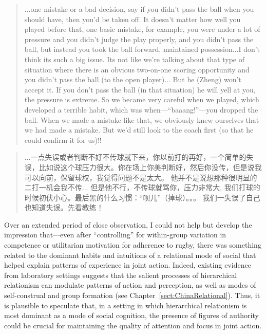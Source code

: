 \begin{CJK}{UTF8}{gbsn}
  \begin{quote}
     ...one mistake or a bad decision, say if you didn't pass the ball when you should have, then you'd be taken off.  It doesn't matter how well you played before that, one basic mistake, for example, you were under a lot of pressure and you didn't judge the play properly, and you didn't pass the ball, but instead you took the ball forward, maintained possession...I don't think its such a big issue.
     Its not like we're talking about that type of situation where there is an obvious two-on-one scoring opportunity and you didn't pass the ball (to the open player)...
     But he (Zheng) won't accept it.  If you don't pass the ball (in that situation) he will yell at you, the pressure is extreme.  So we became very careful when we played, which developed a terrible habit, which was when---``baaang!''---you dropped the ball. When we made a mistake like that, we obviously knew ourselves that we had made a mistake.  But we'd still look to the coach first (so that he could confirm it for us)!!
               \end{quote}

       \begin{quote}
            ...一点失误或者判断不好不传球就下来，你以前打的再好，一个简单的失误，比如说这个球压力很大。你在场上你美判断好，然后你没传，但是说我可以向前，保留球权，我觉得问题不是太大。
           他并不是说想那种很明显的二打一机会我不传...
            但是他不行，不传球就骂你，压力非常大, 我们打球的时候初伏小心。最后黑的什么习惯：“呗儿”（掉球）。。。 我们一失误了自己也知道失误。先看教练！
      \end{quote}

Over an extended period of close observation, I could not help but develop the impression that---even after ``controlling'' for within-group variation in competence or utilitarian motivation for adherence to rugby, there was something related to the dominant habits and intuitions of a relational mode of social that helped explain patterns of experience in joint action.  Indeed, existing evidence from laboratory settings suggests that the salient processes of hierarchical relationism can modulate patterns of action and perception, as well as modes of self-construal and group formation (see Chapter~\ref{sect:ChinaRelational}).  Thus, it is plausible to speculate that, in a setting in which hierarchical relationism is most dominant as a mode of social cognition, the presence of figures of authority could be crucial for maintaining the quality of attention and focus in joint action.


\end{CJK}
